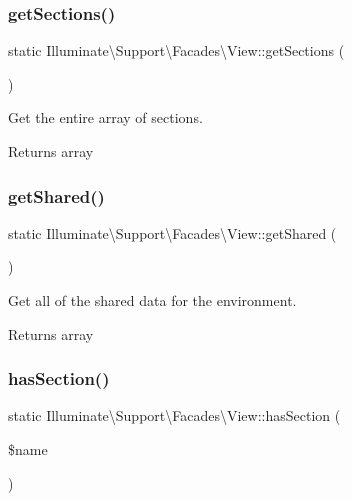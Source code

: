 \subsubsection{\texorpdfstring{get\+Sections()}{getSections()}}
{\footnotesize\ttfamily static Illuminate\textbackslash{}\+Support\textbackslash{}\+Facades\textbackslash{}\+View\+::get\+Sections (\begin{DoxyParamCaption}{ }\end{DoxyParamCaption})\hspace{0.3cm}{\ttfamily [static]}}

Get the entire array of sections.

\begin{DoxyReturn}{Returns}
array 
\end{DoxyReturn}
\mbox{\label{class_illuminate_1_1_support_1_1_facades_1_1_view_afa2c1209a06ace8a20038c0c5471a68b}} 
\subsubsection{\texorpdfstring{get\+Shared()}{getShared()}}
{\footnotesize\ttfamily static Illuminate\textbackslash{}\+Support\textbackslash{}\+Facades\textbackslash{}\+View\+::get\+Shared (\begin{DoxyParamCaption}{ }\end{DoxyParamCaption})\hspace{0.3cm}{\ttfamily [static]}}

Get all of the shared data for the environment.

\begin{DoxyReturn}{Returns}
array 
\end{DoxyReturn}
\mbox{\label{class_illuminate_1_1_support_1_1_facades_1_1_view_ac6d8d7c008064936c930ef4e8b7802ed}} 
\subsubsection{\texorpdfstring{has\+Section()}{hasSection()}}
{\footnotesize\ttfamily static Illuminate\textbackslash{}\+Support\textbackslash{}\+Facades\textbackslash{}\+View\+::has\+Section (\begin{DoxyParamCaption}\item[{}]{\$name }\end{DoxyParamCaption})\hspace{0.3cm}{\ttfamily [static]}}

